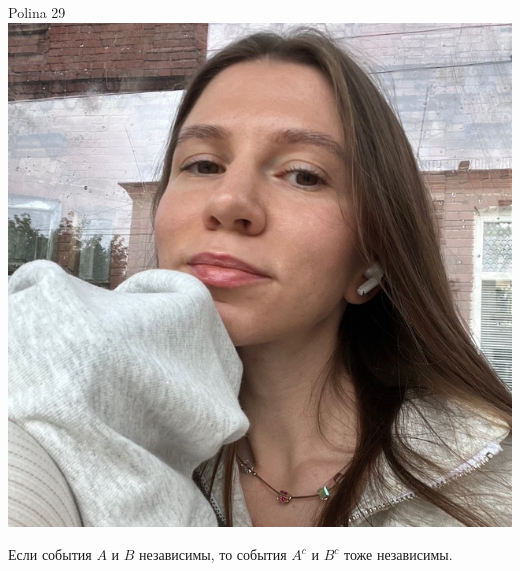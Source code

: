 \documentclass[12pt]{article}
\begin{document}
\begin{minipage}{0.45\textwidth}
\begin{tinderf}{Polina 29}
\includegraphics[width=\textwidth]{tinder-photo/polina.jpg}

  

\begin{mybox}
Если события  $A$ и $B$ независимы, то события $A^c$ и $B^c$ тоже независимы.
\end{mybox}
\end{tinderf}
\end{minipage}
%
\end{document}
